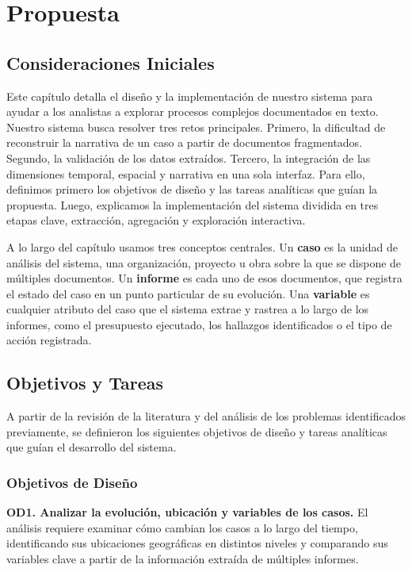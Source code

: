 \chapter{Propuesta} %
\label{cap:propuesta}

\section{Consideraciones Iniciales}

Este capítulo detalla el diseño y la implementación de nuestro 
sistema para ayudar a los analistas a explorar procesos complejos 
documentados en texto. Nuestro sistema busca resolver tres retos 
principales. Primero, la dificultad de reconstruir la narrativa 
de un caso a partir de documentos fragmentados. Segundo, la 
validación de los datos extraídos. Tercero, la integración de 
las dimensiones temporal, espacial y narrativa en una sola 
interfaz. Para ello, definimos primero los objetivos de diseño 
y las tareas analíticas que guían la propuesta. Luego, explicamos 
la implementación del sistema dividida en tres etapas clave, 
extracción, agregación y exploración interactiva.

A lo largo del capítulo usamos tres conceptos centrales. Un 
\textbf{caso} es la unidad de análisis del sistema, una 
organización, proyecto u obra sobre la que se dispone de 
múltiples documentos. Un \textbf{informe} es cada uno de esos 
documentos, que registra el estado del caso en un punto 
particular de su evolución. Una \textbf{variable} es cualquier 
atributo del caso que el sistema extrae y rastrea a lo largo 
de los informes, como el presupuesto ejecutado, los hallazgos 
identificados o el tipo de acción registrada.

\section{Objetivos y Tareas}

A partir de la revisión de la literatura y del análisis de los 
problemas identificados previamente, se definieron los siguientes 
objetivos de diseño y tareas analíticas que guían el desarrollo 
del sistema.

\subsection{Objetivos de Diseño}

\textbf{OD1. Analizar la evolución, ubicación y variables de 
los casos.} El análisis requiere examinar cómo cambian los casos 
a lo largo del tiempo, identificando sus ubicaciones geográficas 
en distintos niveles y comparando sus variables clave a partir 
de la información extraída de múltiples informes.

